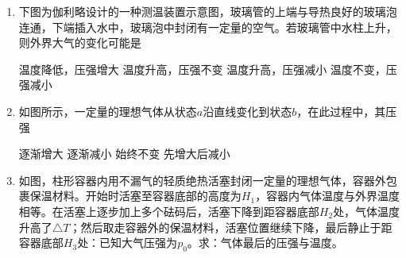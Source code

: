 
\begin{enumerate}[leftmargin=0em]
\renewcommand{\labelenumi}{\arabic{enumi}.}
\item
{}
下图为伽利略设计的一种测温装置示意图，玻璃管的上端与导热良好的玻璃泡连通，下端插入水中，玻璃泡中封闭有一定量的空气。若玻璃管中水柱上升，则外界大气的变化可能是  


\begin{minipage}[h!]{0.7\linewidth}
\vspace{0.3em}
\fourchoices
{温度降低，压强增大}
{温度升高，压强不变}
{温度升高，压强减小}
{温度不变，压强减小}

\vspace{0.3em}
\end{minipage}
\hfill
\begin{minipage}[h!]{0.3\linewidth}
\flushright
\vspace{0.3em}

\vspace{0.3em}
\end{minipage}

\item 
{}
如图所示，一定量的理想气体从状态$ a $沿直线变化到状态$ b $，在此过程中，其压强  
\begin{figure}[h!]
\centering

\end{figure}

\fourchoices
{逐渐增大}
{逐渐减小}
{始终不变}
{先增大后减小}


\item 
{}
如图，柱形容器内用不漏气的轻质绝热活塞封闭一定量的理想气体，容器外包裹保温材料。开始时活塞至容器底部的高度为$ H_{1} $，容器内气体温度与外界温度相等。在活塞上逐步加上多个砝码后，活塞下降到距容器底部$ H_{2} $处，气体温度升高了$ \triangle T $；然后取走容器外的保温材料，活塞位置继续下降，最后静止于距容器底部$ H_{3} $处：已知大气压强为$ p_{0} $。求：气体最后的压强与温度。
\begin{figure}[h!]
\flushright

\end{figure}




\end{enumerate}
